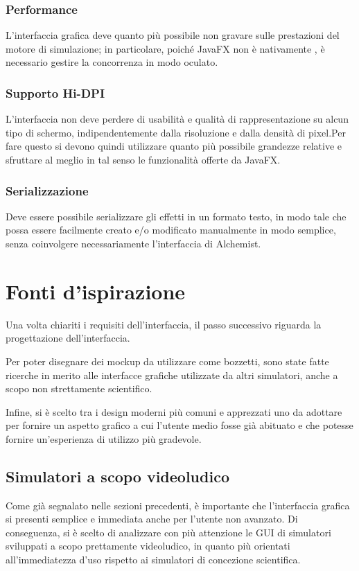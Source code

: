             \subsubsection{Performance}\label{subsub:performance}
                L'interfaccia grafica deve quanto più possibile non gravare sulle prestazioni del motore di simulazione; in particolare, poiché JavaFX non è nativamente , è necessario gestire la concorrenza in modo oculato.

            \subsubsection{Supporto Hi-DPI}\label{subsub:hidpi}
                L'interfaccia non deve perdere di usabilità e qualità di rappresentazione su alcun tipo di schermo, indipendentemente dalla risoluzione e dalla densità di pixel.Per fare questo si devono quindi utilizzare quanto più possibile grandezze relative e sfruttare al meglio in tal senso le funzionalità offerte da JavaFX.

            \subsubsection{Serializzazione }
                Deve essere possibile serializzare gli effetti in un formato testo, in modo tale che possa essere facilmente creato e/o modificato manualmente in modo semplice, senza coinvolgere necessariamente l'interfaccia di Alchemist.

    \section{Fonti d'ispirazione}\label{sec:ispirazione}
        Una volta chiariti i requisiti dell'interfaccia, il passo successivo riguarda la progettazione dell'interfaccia.

        Per poter disegnare dei mockup da utilizzare come bozzetti, sono state fatte ricerche in merito alle interfacce grafiche utilizzate da altri simulatori, anche a scopo non strettamente scientifico.

        Infine, si è scelto tra i design moderni più comuni e apprezzati uno da adottare per fornire un aspetto grafico a cui l'utente medio fosse già abituato e che potesse fornire un'esperienza di utilizzo più gradevole.

        \subsection{Simulatori a scopo videoludico}\label{sub:videogame}
            Come già segnalato nelle sezioni precedenti, è importante che l'interfaccia grafica si presenti semplice e immediata anche per l'utente non avanzato. Di conseguenza, si è scelto di analizzare con più attenzione le GUI di simulatori sviluppati a scopo prettamente videoludico, in quanto più orientati all'immediatezza d'uso rispetto ai simulatori di concezione scientifica.

